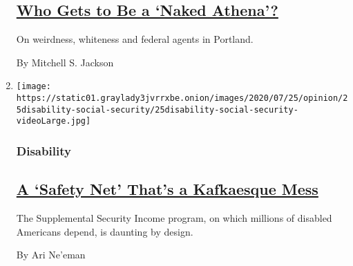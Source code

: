 \begin{enumerate}
  \hypertarget{who-gets-to-be-a-naked-athena}{%
  \subsection{\texorpdfstring{\href{/2020/07/25/opinion/sunday/portland-protests-white.html}{Who
  Gets to Be a `Naked
  Athena'?}}{Who Gets to Be a `Naked Athena'?}}\label{who-gets-to-be-a-naked-athena}}

  On weirdness, whiteness and federal agents in Portland.

  By Mitchell S. Jackson
\item
  \texttt{[image: https://static01.graylady3jvrrxbe.onion/images/2020/07/25/opinion/25disability-social-security/25disability-social-security-videoLarge.jpg]}

  \hypertarget{disability}{%
  \subsubsection{Disability}\label{disability}}

  \hypertarget{a-safety-net-thats-a-kafkaesque-mess}{%
  \subsection{\texorpdfstring{\href{/2020/07/25/opinion/a-safety-net-thats-a-kafkaesque-mess.html}{A
  `Safety Net' That's a Kafkaesque
  Mess}}{A `Safety Net' That's a Kafkaesque Mess}}\label{a-safety-net-thats-a-kafkaesque-mess}}

  The Supplemental Security Income program, on which millions of
  disabled Americans depend, is daunting by design.

  By Ari Ne'eman
\end{enumerate}


